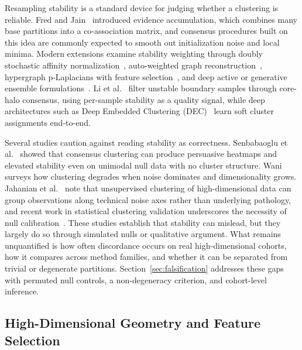 \documentclass[pdflatex,sn-mathphys-num]{sn-jnl}
\theoremstyle{thmstyleone}
\theoremstyle{thmstyletwo}
\theoremstyle{thmstylethree}
\begin{document}
Resampling stability is a standard device for judging whether a clustering is reliable. Fred and Jain~\cite{fred2005combining} introduced evidence accumulation, which combines many base partitions into a co-association matrix, and consensus procedures built on this idea are commonly expected to smooth out initialization noise and local minima. Modern extensions examine stability weighting through doubly stochastic affinity normalization~\cite{cai2025spectral}, auto-weighted graph reconstruction~\cite{yang2025autoweighted}, hypergraph p-Laplacians with feature selection~\cite{hu2024multiview}, and deep active or generative ensemble formulations~\cite{patron2026codac,chen2025ccegan}. Li et al.~\cite{li2019clustering} filter unstable boundary samples through core-halo consensus, using per-sample stability as a quality signal, while deep architectures such as Deep Embedded Clustering (DEC)~\cite{xie2016unsupervised} learn soft cluster assignments end-to-end.

Several studies caution against reading stability as correctness. Senbabaoglu et al.~\cite{senbabaoglu2014critical} showed that consensus clustering can produce persuasive heatmaps and elevated stability even on unimodal null data with no cluster structure. Wani~\cite{wani2024comprehensive} surveys how clustering degrades when noise dominates and dimensionality grows. Jahanian et al.~\cite{jahanian2026highdim} note that unsupervised clustering of high-dimensional data can group observations along technical noise axes rather than underlying pathology, and recent work in statistical clustering validation underscores the necessity of null calibration~\cite{wang2026deep_jasa}. These studies establish that stability can mislead, but they largely do so through simulated nulls or qualitative argument. What remains unquantified is how often discordance occurs on real high-dimensional cohorts, how it compares across method families, and whether it can be separated from trivial or degenerate partitions. Section~\ref{sec:falsification} addresses these gaps with permuted null controls, a non-degeneracy criterion, and cohort-level inference.

\subsection{High-Dimensional Geometry and Feature Selection}\label{sec:rel_geometry}
\end{document}
